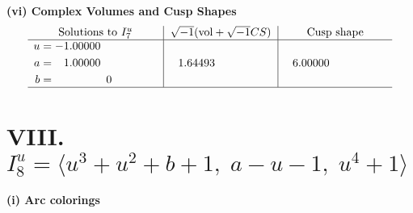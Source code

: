 \documentclass[1p]{elsarticle_modified}
\theoremstyle{definition}
\newcommand{\I}{\sqrt{-1}}
\begin{document}
\newpage\flushleft \textbf{(vi) Complex Volumes and Cusp Shapes}
$$\begin{array}{c|c|c}  
\text{Solutions to }I^u_{7}& \I (\text{vol} + \sqrt{-1}CS) & \text{Cusp shape}\\
 \hline 
\begin{aligned}
u &= -1.00000\phantom{ +0.000000I} \\
a &= \phantom{-}1.00000\phantom{ +0.000000I} \\
b &= \phantom{-0.000000 } 0\end{aligned}
 & \phantom{-}1.64493\phantom{ +0.000000I} & \phantom{-}6.00000\phantom{ +0.000000I}\\
 \hline 
 \end{array}$$\newpage\newpage\renewcommand{\arraystretch}{1}
\centering \section*{VIII. $I^u_{8}= \langle u^3+u^2+b+1,\;a- u-1,\;u^4+1 \rangle$}
\flushleft \textbf{(i) Arc colorings}\\
\end{document}
